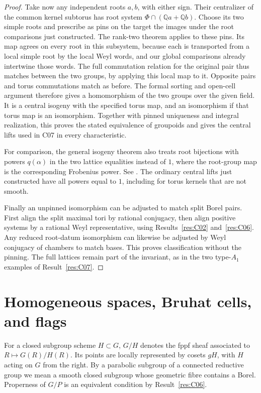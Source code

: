 \documentclass[11pt,a4paper,openany,oneside]{book}
\theoremstyle{resultstyle}
\theoremstyle{definition}
\numberwithin{equation}{chapter}
\begin{document}
\begin{proof}
Take now any independent roots \(a,b\), with either sign.
Their centralizer of the common kernel subtorus has
root system \(\Phi\cap(\mathbb Q a+\mathbb Q b)\).
Choose its two simple roots and prescribe as pins on
the target the images under the root comparisons just
constructed. The rank-two theorem applies to these
pins. Its map agrees on every root in this subsystem,
because each is transported from a local simple root
by the local Weyl words, and our global comparisons
already intertwine those words. The full commutation
relation for the original pair thus matches between the
two groups, by applying this local map to it. Opposite
pairs and torus commutations match as before. The
formal sorting and open-cell argument therefore gives a
homomorphism of the two groups over the given field.
It is a central isogeny with the specified torus map,
and an isomorphism if that torus map is an isomorphism.
Together with pinned uniqueness and integral realization,
this proves the stated equivalence of groupoids and gives
the central lifts used in C07 in every characteristic.

For comparison, the general isogeny theorem also treats
root bijections with powers \(q(\alpha)\) in the two
lattice equalities instead of \(1\), where the root-group
map is the corresponding Frobenius power. See
\cite[Theorem 6.1.16 and Section 6.2]{conrad}.
The ordinary central lifts just constructed have all
powers equal to \(1\), including for torus kernels that
are not smooth.

Finally an unpinned isomorphism can be adjusted to match
split Borel pairs. First align the split maximal tori
by rational conjugacy, then align positive systems by a
rational Weyl representative, using
Results~\ref{res:C02} and~\ref{res:C06}.
Any reduced root-datum isomorphism can likewise be
adjusted by Weyl conjugacy of chambers to match bases.
This proves classification without the pinning.
The full lattices remain part of the invariant, as in
the two type-\(A_1\) examples of Result~\ref{res:C07}.
\end{proof}
\chapter{Homogeneous spaces, Bruhat cells, and flags}
\label{ch:flags}

For a closed subgroup scheme \(H\subset G\), \(G/H\) denotes the fppf sheaf associated to \(R\mapsto G(R)/H(R)\). Its points are locally represented by cosets \(gH\), with \(H\) acting on \(G\) from the right. By a parabolic subgroup of a connected reductive group we mean a smooth closed subgroup whose geometric fibre contains a Borel. Properness of \(G/P\) is an equivalent condition by Result~\ref{res:C06}.
\end{document}
